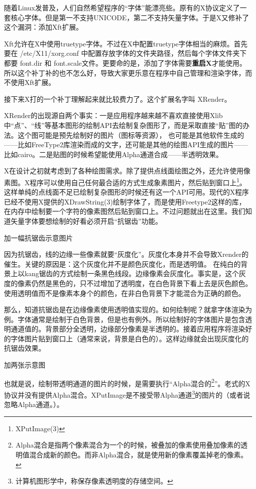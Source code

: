 \documentclass[amstex,twoside]{ctexbook}
\begin{document}
随着Linux发普及，人们自然希望程序的“字体”能漂亮些。原有的X协议定义了一套核心字体。但是第一不支持UNICODE，第二不支持矢量字体。于是X又修补了这个漏洞：添加Xft扩展。

Xft允许在X中使用truetype字体。不过在X中配置truetype字体相当的麻烦。首先要在 /etc/X11/xorg.conf 中配置存放字体的文件夹路径，然后每个字体文件夹下都要 font.dir 和 font.scale文件。更要命的是，添加了字体需要\textbf{重启X}才能使用。所以这个补丁补的也不怎么好，导致大家更乐意在程序中自己管理和渲染字体，而不使用Xft扩展。

接下来X打的一个补丁理解起来就比较费力了。这个扩展名字叫 XRender。

XRender的出现源自两个事实：一是应用程序越来越不喜欢直接使用Xlib中“点”、“线”等基本图形的绘制API去绘制复杂图形了，而是采取直接“贴”图的办法。这个图可能是预先绘制好的图片（图标等资源），
也可能是其他软件生成的——比如FreeType2库渲染而成的文字，还可能是其他的绘图API生成的图片——比如cairo。二是贴图的时候希望能使用Alpha通道合成——半透明效果。

X在设计之初就考虑到了各种绘图需求。除了提供点线面绘图之外，还允许使用像素图。X程序可以使用自己任何最合适的方式生成象素图片，然后贴到窗口上\footnote{XPutImage(3)}。
这样单纯的点线面不足已绘制复杂图形的时候还有这一个API可用。现代的X程序已经不使用X提供的XDrawString(3)绘制字体了，而是使用Freetype2这样的库，在内存中绘制要一个字符的像素图然后贴到窗口上。不过问题就出在这里。我们知道矢量字体要想绘制的好看必须开启“抗锯齿”功能。

加一幅抗锯齿示意图片

因为抗锯齿，线的边缘一些像素就要“灰度化”。灰度化本身并不会导致Xrender的催生。关键的原因是：这个灰度化并不是颜色灰度化，而是透明值。
在纯白的背景上以kang锯齿的方式绘制一条黑色线段。边缘像素会灰度化。事实是，这个灰度的像素仍然是黑色的，只不过增加了透明度，在白色背景下看上去是灰色颜色。使用透明值而不是像素本身个的颜色，在非白色背景下才能混合为正确的颜色。

那么，知道抗锯齿是在边缘像素使用透明值实现的。如何绘制呢？就拿字体渲染为例。字体通常是绘制于白色背景，但是也有例外。所以绘制好的字体图片是包含透明通道值的。背景部分全透明，边缘部分像素是半透明的。接着应用程序将渲染好的字体图片贴到窗口上（通常来说，背景是白色的）。这样边缘就会出现灰度化的抗锯齿效果。

加两张示意图

也就是说，绘制带透明通道的图片的时候，是需要执行“Alpha混合的\footnote{Alpha混合是指两个像素混合为一个的时候，被叠加的像素使用叠加像素的透明值混合成新的颜色。而非Alpha混合，就是使用新的像素覆盖掉老的像素。}”。老式的X协议并没有提供Alpha混合。XPutImage是不接受带Alpha通道\footnote{计算机图形学中，称保存像素透明度的存储空间。}的图片的（或者说忽略Alpha通道。）。
\end{document}
